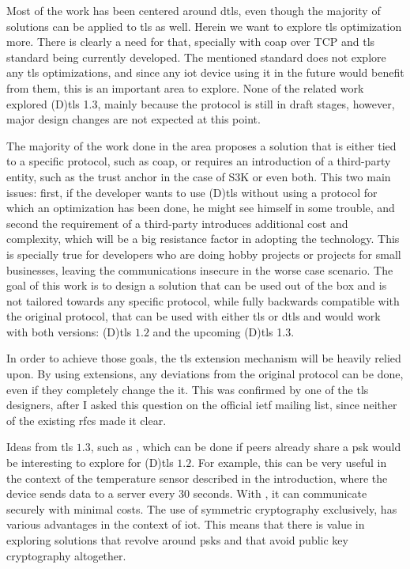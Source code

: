 \documentclass{llncs}
\begin{document}
Most of the work has been centered around \gls{dtls},
even though the majority of solutions can be applied to \gls{tls} as well.
Herein we want to explore \gls{tls} optimization more. There is clearly a need for that, specially with \gls{coap} over
TCP and \gls{tls} standard being currently developed. The mentioned standard does not explore any \gls{tls}
optimizations, and since any \gls{iot} device using it in the future would benefit from
them, this is an important area to explore. None of the related work explored
(D)\gls{tls} 1.3, mainly because the protocol is still in draft stages, however, major design changes are not expected at this point.

The majority of the work done in the area proposes a solution that is either tied to a
specific protocol, such as \gls{coap}, or requires an introduction of a third-party
entity, such as the trust anchor in the case of S3K\cite{S3KScala62:online} or
even both. This two main issues: first, if the developer wants to use (D)\gls{tls}
without using a protocol for which an optimization has been done,
he might see himself in some trouble, and second the requirement of a third-party
introduces additional cost and complexity, which will be a big resistance factor
in adopting the technology. This is specially true for developers who are doing
hobby projects or projects for small businesses, leaving the communications insecure
in the worse case scenario. The goal of this work is to design a solution that can be used out
of the box and is not tailored towards any specific protocol, while fully backwards
compatible with the original protocol, that can be used with either \gls{tls}
or \gls{dtls} and would work with both versions: (D)\gls{tls} $1.2$ and the upcoming
(D)\gls{tls} 1.3.

In order to achieve those goals, the \gls{tls} extension
mechanism will be heavily relied upon. By using extensions, any deviations from the original protocol can be done, even if they completely change the it. This was confirmed by
one of the \gls{tls} designers, after I asked this question on the official
\gls{ietf} mailing list\cite{ReTLSTLS31:online}, since neither of the existing \gls{rfc}s made it clear.

Ideas from \gls{tls} $1.3$, such as , which can be done if peers already share a \gls{psk} would be interesting to
explore for (D)\gls{tls} $1.2$.
For example, this can be very useful in the context of the temperature sensor
described in the introduction, where the device sends data to a server every
30 seconds. With , it can communicate securely with minimal costs.
The use of symmetric cryptography exclusively, has various advantages in the context
of \gls{iot}. This means that there is value in exploring solutions that revolve around
\gls{psk}s and that avoid public key cryptography altogether.
\end{document}
